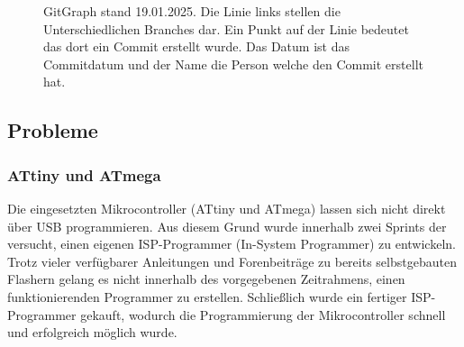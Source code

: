 \begin{figure}[H]
    \centering    
    \caption{GitGraph stand 19.01.2025. Die Linie links stellen die Unterschiedlichen Branches dar. Ein Punkt auf der Linie bedeutet das dort ein Commit erstellt wurde. Das Datum ist das Commitdatum und der Name die Person welche den Commit erstellt hat.}
    \label{gitgraph}
\end{figure}

\subsection{Probleme}
\subsubsection{ATtiny und ATmega}
Die eingesetzten Mikrocontroller (ATtiny und ATmega) lassen sich nicht direkt über USB programmieren. Aus diesem Grund wurde innerhalb zwei Sprints der versucht, einen eigenen ISP-Programmer (In-System Programmer) zu entwickeln. Trotz vieler verfügbarer Anleitungen und Forenbeiträge zu bereits selbstgebauten Flashern gelang es nicht innerhalb des vorgegebenen Zeitrahmens, einen funktionierenden Programmer zu erstellen. Schließlich wurde ein fertiger ISP-Programmer gekauft, wodurch die Programmierung der Mikrocontroller schnell und erfolgreich möglich wurde.

